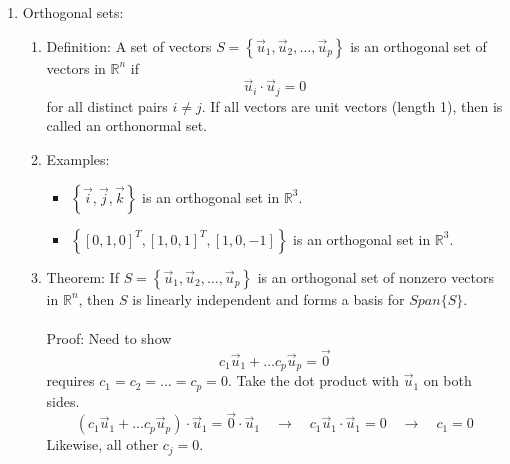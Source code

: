 \documentclass{article}
\begin{document}
\begin{enumerate}

\item Orthogonal sets:
\begin{enumerate}
\item Definition: A set of vectors $S= \left\{ \vec{u}_1, \vec{u}_2, \dots, \vec{u}_p \right\}$ is an orthogonal set of vectors in $\mathbb{R}^n$ if
\[
\vec{u}_i \cdot \vec{u}_j = 0
\]
for all distinct pairs $i \neq j$. If all vectors are unit vectors (length 1), then is called an orthonormal set.

\item Examples: 
\begin{itemize}
\item $\left\{ \vec{i}, \vec{j}, \vec{k} \right\}$ is an orthogonal set in $\mathbb{R}^3$. 
\item $\left\{ [0,1,0]^T, [1,0,1]^T, [1,0,-1] \right\}$ is an orthogonal set in $\mathbb{R}^3$. 
\end{itemize}

\item Theorem: If $S=\left\{ \vec{u}_1, \vec{u}_2, \dots, \vec{u}_p \right\}$ is an orthogonal set of nonzero vectors in $\mathbb{R}^n$, then $S$ is linearly independent and forms a basis for $Span \{ S \}$. 
\\ \ \\
Proof: Need to show
\[
c_1 \vec{u}_1 + \dots c_p \vec{u}_p = \vec{0}
\]
requires $c_1=c_2=\dots=c_p = 0$. Take the dot product with $\vec{u}_1$ on both sides.
\[
(c_1 \vec{u}_1 + \dots c_p \vec{u}_p) \cdot \vec{u}_1 = \vec{0}\cdot \vec{u}_1 \quad \rightarrow \quad c_1 \vec{u}_1 \cdot \vec{u}_1 = 0 \quad \rightarrow \quad c_1=0
\]
Likewise, all other $c_j=0$. 
\end{enumerate}


\end{enumerate}
\end{document}
